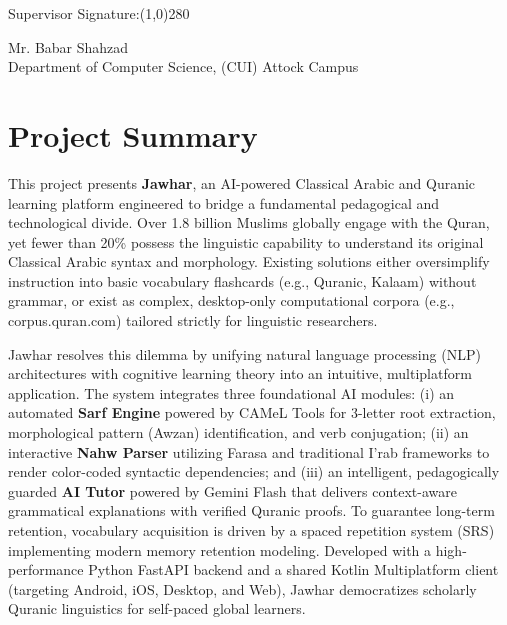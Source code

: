 \documentclass[A4paper,12pt]{article}
\begin{document}
\vspace{0.1in}

Supervisor Signature:\line(1,0){280}
\begin{center}
\normalsize{Mr. Babar Shahzad\\
Department of Computer Science, (CUI) Attock Campus}
\end{center}
\vspace{0.1in}
\newpage

\cfoot{\thepage}
\medskip

\section*{\fontsize{16}{12}\selectfont Project Summary}
This project presents \textbf{Jawhar}, an AI-powered Classical Arabic and Quranic learning platform engineered to bridge a fundamental pedagogical and technological divide. Over 1.8 billion Muslims globally engage with the Quran, yet fewer than 20\% possess the linguistic capability to understand its original Classical Arabic syntax and morphology. Existing solutions either oversimplify instruction into basic vocabulary flashcards (e.g., Quranic, Kalaam) without grammar, or exist as complex, desktop-only computational corpora (e.g., corpus.quran.com) tailored strictly for linguistic researchers. 

Jawhar resolves this dilemma by unifying natural language processing (NLP) architectures with cognitive learning theory into an intuitive, multiplatform application. The system integrates three foundational AI modules: (i) an automated \textbf{Sarf Engine} powered by CAMeL Tools for 3-letter root extraction, morphological pattern (Awzan) identification, and verb conjugation; (ii) an interactive \textbf{Nahw Parser} utilizing Farasa and traditional I'rab frameworks to render color-coded syntactic dependencies; and (iii) an intelligent, pedagogically guarded \textbf{AI Tutor} powered by Gemini Flash that delivers context-aware grammatical explanations with verified Quranic proofs. To guarantee long-term retention, vocabulary acquisition is driven by a spaced repetition system (SRS) implementing modern memory retention modeling. Developed with a high-performance Python FastAPI backend and a shared Kotlin Multiplatform client (targeting Android, iOS, Desktop, and Web), Jawhar democratizes scholarly Quranic linguistics for self-paced global learners.

\newpage
\pagestyle{fancy}
\end{document}
